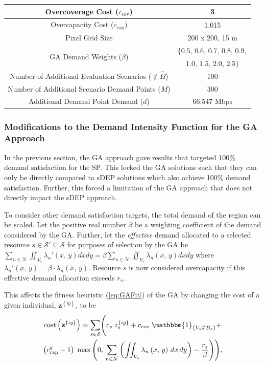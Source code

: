 \documentclass[12pt,dvipsnames]{report}
\newcommand{\ind}[1]{\mathbbm{1}_{\left\{ #1 \right\}}}
\begin{document}
\begin{table}[p]
\begin{tabular}{|c|c|}
		\hline 
		Overcoverage Cost ($c_\text{cov}$) & 3 \\
		\hline
		Overcapacity Cost ($c_\text{cap}$) & 1.015 \\ 
		\hline
		Pixel Grid Size & 200 x 200, 15 m \\ 
		\hline
		\multirow{2}{*}{GA Demand Weights ($\beta$)} & $\{ 0.5,\, 0.6,\, 0.7,\, 0.8,\, 0.9,$ \\
		& $1.0,\, 1.5,\, 2.0,\, 2.5 \}$ \\
		\hline
		\hline
		Number of Additional Evaluation Scenarios ($\not\in \hat{\Omega}$) & 100 \\
		\hline
		Number of Additional Scenario Demand Points ($M$) & 300 \\
		\hline
		Additional Demand Point Demand ($d$) & 66.547 Mbps \\
		\hline
	\end{tabular}
	\label{tab:CaseI_SimVal}
\end{table}

\subsubsection{Modifications to the Demand Intensity Function for the GA Approach}

In the previous section, the GA approach gave results that targeted 100\% demand satisfaction for the SP.  This locked the GA solutions such that they can only be directly compared to sDEP solutions which also achieve 100\% demand satisfaction.  Further, this forced a limitation of the GA approach that does not directly impact the sDEP approach.

To consider other demand satisfaction targets, the total demand of the region can be scaled.  Let the positive real number $\beta$ be a weighting coefficient of the demand considered by the GA.  Further, let the \emph{effective} demand allocated to a selected resource $s \in \mathcal{S}' \subseteq \mathcal{S}$ for purposes of selection by the GA be $\sum_{n \in \mathcal{N}} \iint_{V_s} \lambda_n'\left( x,\, y \right) dx dy = \beta \sum_{n \in \mathcal{N}} \iint_{V_s} \lambda_n\left( x,\, y \right) dx dy$ where $\lambda_n'\left( x,\, y \right) = \beta \cdot \lambda_n\left( x,\, y \right)$.  Resource $s$ is now considered overcapacity if this effective demand allocation exceeds $r_s$.

This affects the fitness heuristic (\cref{eq:GAFit}) of the GA by changing the cost of a given individual, $\textbf{z}^{\left\{ ig \right\}}$, to be
\begin{multline} \label{eq:GAModifiedCost}
	\mathrm{cost}\left( \textbf{z}^{\left\{ ig \right\}} \right) = \sum_{s \in \mathcal{S}} \Biggl( c_s \; z_s^{\left\{ ig \right\}} + c_\text{cov} \; \ind{V_s \not\subseteq B_s} + \\ \left( c_\text{cap}^g - 1 \right) \; \max\left( 0,\, \sum_{n \in \mathcal{N}} \left( \iint_{V_s} \lambda_n\left( x,\, y \right)\, dx\, dy \right) - \frac{r_s}{\beta} \right) \Biggr),
\end{multline}
\end{document}
